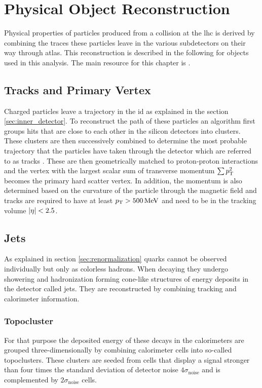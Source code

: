 \chapter{Physical Object Reconstruction}

Physical properties of particles produced from a collision at the \ac{lhc} is derived by combining the traces these particles leave in the various subdetectors on their way through \ac{atlas}. This  reconstruction is described in the following for objects used in this analysis. The main resource for this chapter is \citep{atlas2021optimisation}.

\section{Tracks and Primary Vertex}\label{sec:tracks}
Charged particles leave a trajectory in the \ac{id} as explained in the section \ref{sec:inner_detector}. To reconstruct the path of these particles an algorithm first groups hits that are close to each other in the silicon detectors into clusters. These clusters are then successively combined to determine the most probable trajectory that the particles have taken through the detector which are referred to as tracks \citep{aaboud2017performance}. These are then geometrically matched to proton-proton interactions and the vertex with the largest scalar sum of transverse momentum $\sum p_{\text{T}}^2$ becomes the primary hard scatter vertex. In addition, the momentum is also determined based on the curvature of the particle through the magnetic field and tracks are required to have at least $p_{\text{T}}>\qty[]{500}{MeV}$ and need to be in the tracking volume $\left\vert\eta\right\vert<2.5$.

\section{Jets}
As explained in section \ref{sec:renormalization} quarks cannot be observed individually but only as colorless hadrons. When decaying they undergo showering and hadronization forming cone-like structures of energy deposits in the detector called jets. They are reconstructed by combining tracking and calorimeter information.

\subsection{Topocluster}
For that purpose the deposited energy of these decays in the calorimeters are grouped three-dimensionally by combining calorimeter cells into so-called topoclusters. These clusters are seeded from cells that display a signal stronger than four times the standard deviation of detector noise $4\sigma_\mathrm{noise}$ and is complemented by $2\sigma_\mathrm{noise}$ cells.

